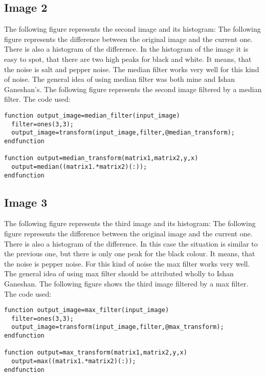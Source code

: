 \documentclass[a4paper]{article}
\begin{document}
\subsection{Image 2}
The following figure represents the second image and its histogram:
The following figure represents the difference between the original image
and the current one. There is also a histogram of the difference.
In the histogram of the image it is easy to spot, that there are two high peaks for black and white. It means, that the noise is salt and pepper noise. The median filter works very well for this kind of noise. The general idea of using median filter was both mine and Ishan Ganeshan's. The following figure represents the second image filtered by a median filter.
{\noindent}The code used:
\begin{lstlisting}
function output_image=median_filter(input_image)
  filter=ones(3,3);
  output_image=transform(input_image,filter,@median_transform);
endfunction

function output=median_transform(matrix1,matrix2,y,x)
  output=median((matrix1.*matrix2)(:));
endfunction
\end{lstlisting}
\subsection{Image 3}
The following figure represents the third image and its histogram:
The following figure represents the difference between the original image
and the current one. There is also a histogram of the difference.
In this case the situation is similar to the previous one, but there is only one peak for the black colour. It means, that the noise is pepper noise. For this kind of noise the max filter works very well. The general idea of using max filter should be attributed wholly to Ishan Ganeshan. The following figure shows the third image filtered by a max filter.
{\noindent}The code used:
\begin{lstlisting}
function output_image=max_filter(input_image)
  filter=ones(3,3);
  output_image=transform(input_image,filter,@max_transform);
endfunction

function output=max_transform(matrix1,matrix2,y,x)
  output=max((matrix1.*matrix2)(:));
endfunction
\end{lstlisting}
\end{document}
